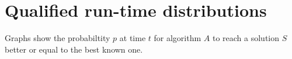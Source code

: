 \newpage\cleardoublepage{}
\section{Qualified run-time distributions}
\label{app:qrd}

Graphs show the probabiltity $p$ at time $t$ for algorithm $A$ to reach a solution $S$ better or equal to the best known one.

